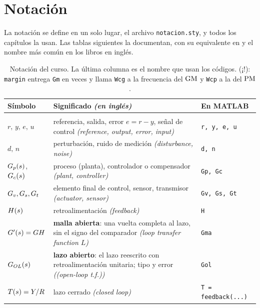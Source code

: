 \section*{Notación}

La notación se define en un solo lugar, el archivo \texttt{notacion.sty}, y todos los capítulos la usan. Las tablas siguientes la documentan, con su equivalente en \matlab{} y el nombre más común en los libros en inglés.

{\small
\begin{xltabular}{\linewidth}{@{}>{\raggedright\arraybackslash}p{2.9cm} >{\raggedright\arraybackslash}X >{\raggedright\arraybackslash\ttfamily\footnotesize}p{2.5cm}@{}}
\caption{Notación del curso. La última columna es el nombre que usan los códigos. (¡!): \texttt{margin} entrega \texttt{Gm} en veces y llama \texttt{Wcg} a la frecuencia del $\GM$ y \texttt{Wcp} a la del $\PM$.}\label{tab:notacion}\\
\toprule
\textbf{Símbolo} & \textbf{Significado} \textcolor{ctrlgris}{\textit{(en inglés)}} & \textbf{\normalfont\small\bfseries En MATLAB}\\
\midrule
\endhead
{}\\
$r,\,y,\,e,\,u$ & referencia, salida, error $e=r-y$, señal de control \textcolor{ctrlgris}{\textit{(reference, output, error, input)}} & \texttt{r, y, e, u}\\
$d,\,n$ & perturbación, ruido de medición \textcolor{ctrlgris}{\textit{(disturbance, noise)}} & \texttt{d, n}\\
$G_p(s)$, $G_c(s)$ & proceso (planta), controlador o compensador \textcolor{ctrlgris}{\textit{(plant, controller)}} & \texttt{Gp, Gc}\\
$G_v,G_s,G_t$ & elemento final de control, sensor, transmisor \textcolor{ctrlgris}{\textit{(actuator, sensor)}} & \texttt{Gv, Gs, Gt}\\
$H(s)$ & retroalimentación \textcolor{ctrlgris}{\textit{(feedback)}} & \texttt{H}\\
$G'(s)=GH$ & \textbf{malla abierta}: una vuelta completa al lazo, sin el signo del comparador \textcolor{ctrlgris}{\textit{(loop transfer function $L$)}} & \texttt{Gma}\\
$G_{OL}(s)$ & \textbf{lazo abierto}: el lazo reescrito con retroalimentación unitaria; tipo y error \textcolor{ctrlgris}{\textit{((open-loop t.f.))}} & \texttt{Gol}\\
$T(s)=Y/R$ & lazo cerrado \textcolor{ctrlgris}{\textit{(closed loop)}} & \texttt{T = feedback(...)}\\

\end{xltabular}}

